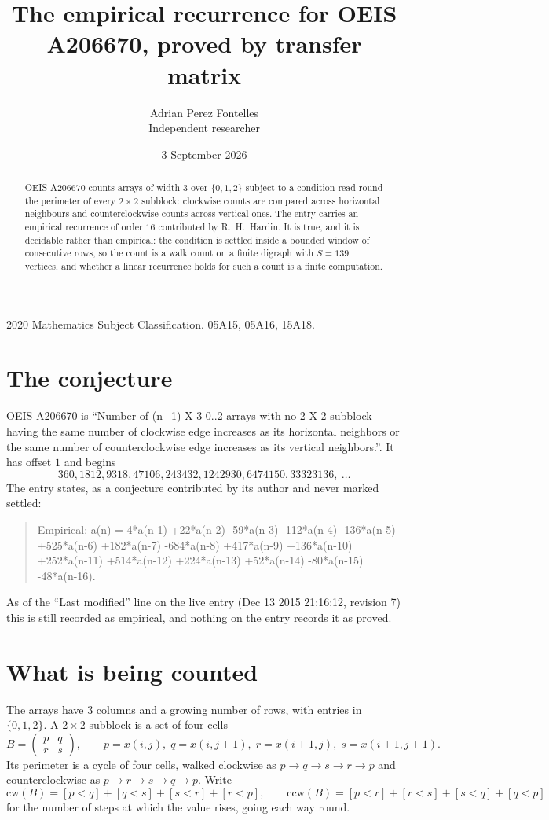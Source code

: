 \documentclass[11pt,a4paper]{article}
\title{The empirical recurrence for OEIS A206670, proved by transfer matrix}
\author{Adrian Perez Fontelles\\ \small Independent researcher}
\date{3 September 2026}
\theoremstyle{plain}
\theoremstyle{definition}
\begin{document}
\maketitle

\begin{abstract}
OEIS A206670 counts arrays of width $3$ over $\{0,1,2\}$ subject to a condition read round the
perimeter of every $2\times2$ subblock: clockwise counts are compared across horizontal neighbours and counterclockwise counts across vertical ones. The entry carries an empirical recurrence of
order $16$ contributed by R.~H.~Hardin. It is true, and it is decidable rather than
empirical: the condition is settled inside a bounded window of consecutive rows, so the
count is a walk count on a finite digraph with $S=139$ vertices, and whether a linear
recurrence holds for such a count is a finite computation.
\end{abstract}

\noindent\small 2020 Mathematics Subject Classification. 05A15, 05A16, 15A18.\normalsize

\section{The conjecture}

OEIS A206670 is ``Number of (n+1) X 3 0..2 arrays with no 2 X 2 subblock having the same number of clockwise edge increases as its horizontal neighbors or the same number of counterclockwise edge increases as its vertical neighbors.''. It has offset $1$ and begins
\[
360, 1812, 9318, 47106, 243432, 1242930, 6474150, 33323136,\ \dots
\]
The entry states, as a conjecture contributed by its author and never marked settled:
\begin{quote}
Empirical: a(n) = 4*a(n-1) +22*a(n-2) -59*a(n-3) -112*a(n-4) -136*a(n-5) +525*a(n-6) +182*a(n-7) -684*a(n-8) +417*a(n-9) +136*a(n-10) +252*a(n-11) +514*a(n-12) +224*a(n-13) +52*a(n-14) -80*a(n-15) -48*a(n-16).
\end{quote}
As of the ``Last modified'' line on the live entry (Dec 13 2015 21:16:12, revision 7) this is still
recorded as empirical, and nothing on the entry records it as proved.

\section{What is being counted}

The arrays have $3$ columns and a growing number of rows, with entries in $\{0,1,2\}$. A
$2\times2$ subblock is a set of four cells
\[
B=\begin{pmatrix} p & q \\ r & s \end{pmatrix},
\qquad p=x(i,j),\; q=x(i,j+1),\; r=x(i+1,j),\; s=x(i+1,j+1).
\]
Its perimeter is a cycle of four cells, walked clockwise as $p\to q\to s\to r\to p$ and
counterclockwise as $p\to r\to s\to q\to p$. Write
\[
\mathrm{cw}(B)=[p<q]+[q<s]+[s<r]+[r<p],\qquad
\mathrm{ccw}(B)=[p<r]+[r<s]+[s<q]+[q<p]
\]
for the number of steps at which the value rises, going each way round.
\end{document}
